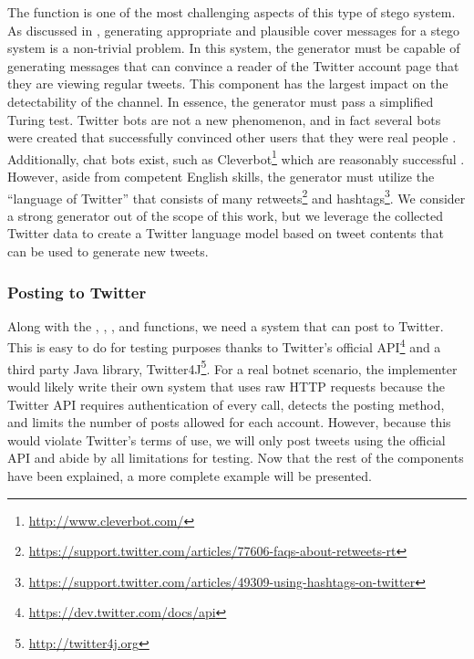 The  function is one of the most challenging aspects of this type
of stego system.  As discussed in \cite{steganalysis}, generating appropriate
and plausible cover messages for a stego system is a non-trivial problem.  In this
system, the generator must be capable of generating messages that can convince a
reader of the Twitter account page that they are viewing regular tweets.  This
component has the largest impact on the detectability of the channel.  In
essence, the generator must pass a simplified Turing test.  Twitter bots are not
a new phenomenon, and in fact several bots were created that successfully
convinced other users that they were real people \cite{realboy}.  Additionally,
chat bots exist, such as Cleverbot\footnote{\url{http://www.cleverbot.com/}}
which are reasonably successful \cite{dialogue-system}.  However, aside from
competent English skills, the generator must utilize the ``language of Twitter''
that consists of many
retweets\footnote{\url{https://support.twitter.com/articles/77606-faqs-about-retweets-rt}}
and
hashtags\footnote{\url{https://support.twitter.com/articles/49309-using-hashtags-on-twitter}}.
We consider a strong generator out of the scope of this work, but we leverage the collected Twitter data to create a Twitter language model
based on tweet contents that can be used to generate new tweets.

\subsubsection{Posting to Twitter}
\label{subsec:methodology:twittercc:posting}

Along with the , , , and 
functions, we need a system that can post to Twitter.
This is easy to do for testing purposes thanks to Twitter's official
API\footnote{\url{https://dev.twitter.com/docs/api}} and a third party Java
library, Twitter4J\footnote{\url{http://twitter4j.org}}.
For a real botnet scenario, the implementer would likely write their own system
that uses raw HTTP requests because the Twitter API requires authentication of
every call, detects the posting method, and limits the number of posts allowed
for each account.  However, because this would violate Twitter's terms of use, we
will only post tweets using the official API and abide by all limitations
for testing.  Now that the rest of the components have been explained, a more
complete example will be presented.

